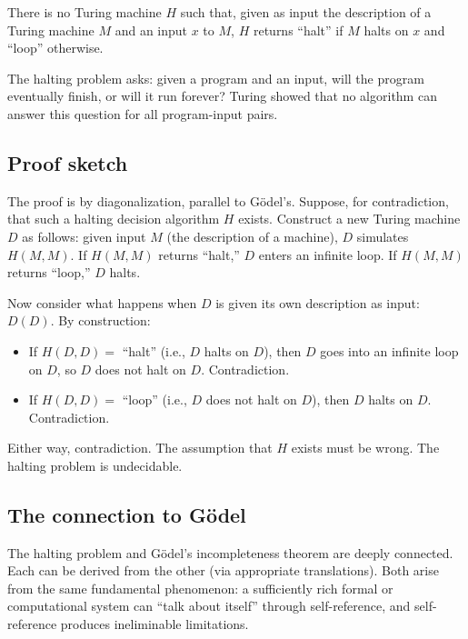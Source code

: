 \begin{theorem}
\label{thm:halting}
There is no Turing machine $H$ such that, given as input the
description of a Turing machine $M$ and an input $x$ to $M$, $H$
returns ``halt'' if $M$ halts on $x$ and ``loop'' otherwise.
\end{theorem}

The halting problem asks: given a program and an input, will the
program eventually finish, or will it run forever? Turing showed
that no algorithm can answer this question for all program-input
pairs.

\subsection{Proof sketch}

The proof is by diagonalization, parallel to G\"odel's. Suppose,
for contradiction, that such a halting decision algorithm $H$
exists. Construct a new Turing machine $D$ as follows: given input
$M$ (the description of a machine), $D$ simulates $H(M, M)$. If
$H(M, M)$ returns ``halt,'' $D$ enters an infinite loop. If $H(M, M)$
returns ``loop,'' $D$ halts.

Now consider what happens when $D$ is given its own description as
input: $D(D)$. By construction:

\begin{itemize}[leftmargin=2em]
    \item If $H(D, D) = $ ``halt'' (i.e., $D$ halts on $D$), then
    $D$ goes into an infinite loop on $D$, so $D$ does not halt on
    $D$. Contradiction.
    \item If $H(D, D) = $ ``loop'' (i.e., $D$ does not halt on $D$),
    then $D$ halts on $D$. Contradiction.
\end{itemize}

Either way, contradiction. The assumption that $H$ exists must be
wrong. The halting problem is undecidable.

\subsection{The connection to G\"odel}

The halting problem and G\"odel's incompleteness theorem are deeply
connected. Each can be derived from the other (via appropriate
translations). Both arise from the same fundamental phenomenon: a
sufficiently rich formal or computational system can ``talk about
itself'' through self-reference, and self-reference produces
ineliminable limitations.

